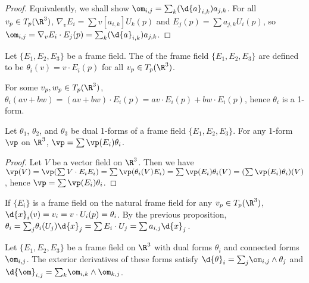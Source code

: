 \documentclass[10pt]{article}
\begin{document}
\begin{proof}
    Equivalently, we shall show ${\om}_{i,j}={\sum}_{k}(\d{a}_{i,k}){a}_{j,k}$. For all ${v}_{p}\in{T}_{p}({\R}^{3})$, ${\nabla}_{v}{E}_{i}=\sum v[{a}_{i,k}]{U}_{k}(p)$ and ${E}_{j}(p)=\sum{a}_{j,k}{U}_{i}(p)$, so ${\om}_{i,j}={\nabla}_{v}{E}_{i}\cdot{E}_{j}(p)={\sum}_{k}(\d{a}_{i,k}){a}_{j,k}$.
\end{proof}
\begin{definition}
    Let $\{{E}_{1},{E}_{2},{E}_{3}\}$ be a frame field. The  of the frame field $\{{E}_{1},{E}_{2},{E}_{3}\}$ are defined to be ${\theta}_{i}(v)=v\cdot{E}_{i}(p)$ for all ${v}_{p}\in{T}_{p}({\R}^{3})$.
\end{definition}
\par
For some ${v}_{p},{w}_{p}\in{T}_{p}({\R}^{3})$, ${\theta}_{i}(av+bw)=(av+bw)\cdot{E}_{i}(p)=av\cdot{E}_{i}(p)+bw\cdot{E}_{i}(p)$, hence ${\theta}_{i}$ is a 1-form.
\begin{proposition}
    Let ${\theta}_{1}$, ${\theta}_{2}$, and ${\theta}_{3}$ be dual 1-forms of a frame field $\{{E}_{1},{E}_{2},{E}_{3}\}$. For any 1-form $\vp$ on ${\R}^{3}$, $\vp=\sum\vp({E}_{i}){\theta}_{i}$.
\end{proposition}
\begin{proof}
    Let $V$ be a vector field on ${\R}^{3}$. Then we have $\vp(V)=\vp(\sum V\cdot{E}_{i}{E}_{i})=\sum\vp({\theta}_{i}(V){E}_{i})=\sum\vp({E}_{i}){\theta}_{i}(V)=(\sum\vp({E}_{i}){\theta}_{i})(V)$, hence $\vp=\sum\vp({E}_{i}){\theta}_{i}$.
\end{proof}
\par
If $\{{E}_{i}\}$ is a frame field on the natural frame field for any ${v}_{p}\in{T}_{p}({\R}^{3})$, $\d{x}_{i}(v)={v}_{i}=v\cdot{U}_{i}(p)={\theta}_{i}$. By the previous proposition, ${\theta}_{i}={\sum}_{j}{\theta}_{i}({U}_{j})\d{x}_{j}=\sum{E}_{i}\cdot{U}_{j}=\sum{a}_{i,j}\d{x}_{j}$.
\begin{theorem}
    Let $\{{E}_{1},{E}_{2},{E}_{3}\}$ be a frame field on ${\R}^{3}$ with dual forms ${\theta}_{i}$ and connected forms ${\om}_{i,j}$. The exterior derivatives of these forms satisfy $\d{\theta}_{i}={\sum}_{j}{\om}_{i,j}\wedge{\theta}_{j}$ and $\d{\om}_{i,j}={\sum}_{k}{\om}_{i,k}\wedge{\om}_{k,j}$.
\end{theorem}
\end{document}
